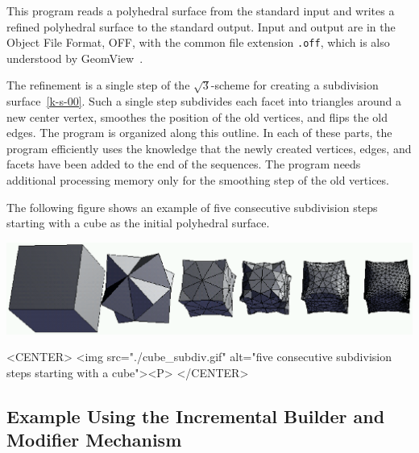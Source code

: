This program reads a polyhedral surface from the standard input and
writes a refined polyhedral surface to the standard output. Input and
output are in the Object File Format, OFF, with the common file
extension {\tt .off}, which is also understood by
GeomView~\cite{p-gmgv15-94}.

The refinement is a single step of the $\sqrt{3}$-scheme for creating
a subdivision surface~\ref{k-s-00}. Such a single step subdivides
each facet into triangles around a new center vertex, smoothes the
position of the old vertices, and flips the old edges. The program is
organized along this outline. In each of these parts, the program
efficiently uses the knowledge that the newly created vertices, edges,
and facets have been added to the end of the sequences. The program
needs additional processing memory only for the smoothing step of the
old vertices.

The following figure shows an example of five consecutive subdivision
steps starting with a cube as the initial polyhedral surface.

\begin{ccTexOnly}
    \begin{center}
      \parbox{\textwidth}{%
          \includegraphics[width=\textwidth]{fig/cube_subdiv.ps}%
      }
    \end{center}
\end{ccTexOnly}

\begin{ccHtmlOnly}
    <CENTER>
        <img src="./cube_subdiv.gif" 
          alt="five consecutive subdivision steps starting with a cube"><P>
    </CENTER>
\end{ccHtmlOnly}


\subsection{Example Using the Incremental Builder and Modifier Mechanism}

